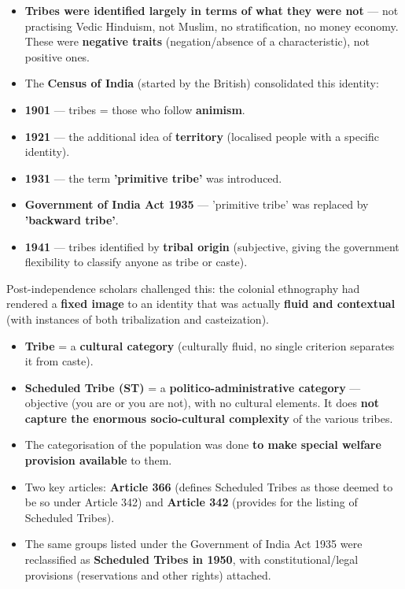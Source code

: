 \begin{KeyConcept}
\begin{itemize}
\item \textbf{Tribes were identified largely in terms of what they were not} --- not practising Vedic Hinduism, not Muslim, no stratification, no money economy. These were \textbf{negative traits} (negation/absence of a characteristic), not positive ones.
\item The \textbf{Census of India} (started by the British) consolidated this identity:
\item \textbf{1901} --- tribes = those who follow \textbf{animism}.
\item \textbf{1921} --- the additional idea of \textbf{territory} (localised people with a specific identity).
\item \textbf{1931} --- the term \textbf{'primitive tribe'} was introduced.
\item \textbf{Government of India Act 1935} --- 'primitive tribe' was replaced by \textbf{'backward tribe'}.
\item \textbf{1941} --- tribes identified by \textbf{tribal origin} (subjective, giving the government flexibility to classify anyone as tribe or caste).
\end{itemize}
\end{KeyConcept}

Post-independence scholars challenged this: the colonial ethnography had rendered a \textbf{fixed image} to an identity that was actually \textbf{fluid and contextual} (with instances of both tribalization and casteization).

\begin{KeyConcept}
\begin{itemize}
\item \textbf{Tribe} = a \textbf{cultural category} (culturally fluid, no single criterion separates it from caste).
\item \textbf{Scheduled Tribe (ST)} = a \textbf{politico-administrative category} --- objective (you are or you are not), with no cultural elements. It does \textbf{not capture the enormous socio-cultural complexity} of the various tribes.
\item The categorisation of the population was done \textbf{to make special welfare provision available} to them.
\end{itemize}
\end{KeyConcept}

\begin{GovtPolicy}
\begin{itemize}
\item Two key articles: \textbf{Article 366} (defines Scheduled Tribes as those deemed to be so under Article 342) and \textbf{Article 342} (provides for the listing of Scheduled Tribes).
\item The same groups listed under the Government of India Act 1935 were reclassified as \textbf{Scheduled Tribes in 1950}, with constitutional/legal provisions (reservations and other rights) attached.
\end{itemize}
\end{GovtPolicy}

